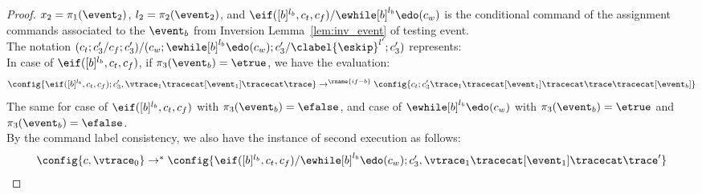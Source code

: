 \begin{proof}
$x_2 = \pi_1(\event_2)$, $l_2 = \pi_2(\event_2)$, 
and $\eif ([b]^{l_b}, c_t, c_f) / \ewhile [b]^{l_b} \edo (c_w)$ 
is the conditional command of the assignment commands associated to the 
$\event_b$ from Inversion Lemma~\ref{lem:inv_event} of testing event.
\\
The notation $(c_t;c_3' / c_f;c_3') /(c_w; \ewhile [b]^{l_b} \edo (c_w);c_3' / \clabel{\eskip}^{l'}; c_3')$ represents:
\\
In case of $\eif ([b]^{l_b}, c_t, c_f)$, if $\pi_3(\event_b) = \etrue$, we have the evaluation:
$$
\config{\eif ([b]^{l_b}, c_t, c_f) ;{c}_3', 
\vtrace_1 \tracecat [\event_1] \tracecat \trace} 
 \rightarrow^{\rname{if-b}} 
\config{c_t;c_3' 
\trace_1 \tracecat [\event_1] \tracecat \trace \tracecat [\event_b]} 
$$
%
The same for case of $\eif ([b]^{l_b}, c_t, c_f)$ with $\pi_3(\event_b) = \efalse$,
and case of $\ewhile [b]^{l_b} \edo (c_w)$ with $\pi_3(\event_b) = \etrue$ and $\pi_3(\event_b) = \efalse$.
%
\\
By the command label consistency,
we also have the instance of second execution as follows:
\begin{equation}
\label{eq:ctldep_inv2}
\begin{array}{l}   
  \config{{c}, \vtrace_0} \rightarrow^{*} 
    \config{\eif ([b]^{l_b}, c_t, c_f) / \ewhile [b]^{l_b} \edo (c_w);{c}_3', 
    \vtrace_1 \tracecat [\event_1] \tracecat \trace'} 
    \\

\end{array}
\end{equation}
\end{proof}
